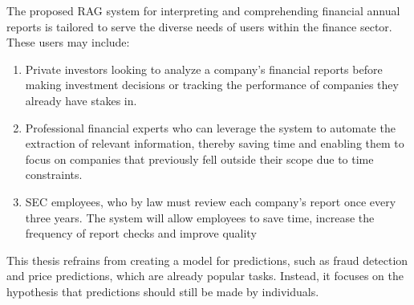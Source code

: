 The proposed RAG system for interpreting and comprehending financial annual reports is tailored to serve the diverse needs of users within the finance sector. These users may include:
\begin{enumerate}
\item Private investors looking to analyze a company's financial reports before making investment decisions or tracking the performance of companies they already have stakes in.
\item Professional financial experts who can leverage the system to automate the extraction of relevant information, thereby saving time and enabling them to focus on companies that previously fell outside their scope due to time constraints.
\item SEC employees, who by law must review each company's report once every three years. The system will allow employees to save time, increase the frequency of report checks and improve quality
\end{enumerate}

This thesis refrains from creating a model for predictions, such as fraud detection and price predictions, which are already popular tasks. Instead, it focuses on the hypothesis that predictions should still be made by individuals.